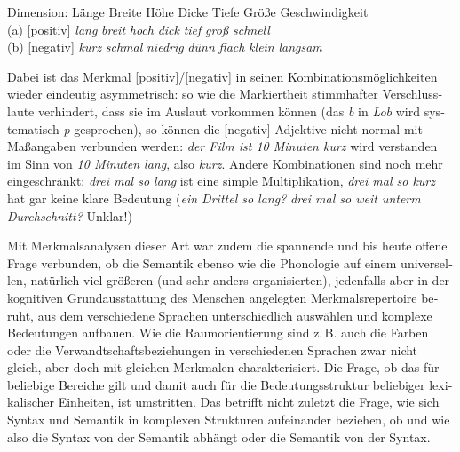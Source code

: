 \documentclass[output=paper,colorlinks,citecolor=brown]{langscibook}
\begin{document}
\begin{otherlanguage}{german}
\ea
\glll Dimension: Länge Breite Höhe Dicke Tiefe Größe Geschwindigkeit \\
{(a) [positiv]} \textit{lang} \textit{breit} \textit{hoch} \textit{dick} \textit{tief} \textit{groß} \textit{schnell} \\
{(b) [negativ]} \textit{kurz} \textit{schmal} \textit{niedrig} \textit{dünn} \textit{flach} \textit{klein} \textit{langsam} \\ 
\label{ex:9}
\z

\noindent Dabei ist das Merkmal [positiv]/[negativ] in seinen Kombinationsmöglichkeiten wieder eindeutig asymmetrisch: so wie die Markiertheit stimmhafter Verschlusslaute verhindert, dass sie im Auslaut vorkommen können (das \textit{b} in \textit{Lob} wird systematisch \textit{p} gesprochen), so können die [negativ]-Adjektive nicht normal mit Maßangaben verbunden werden: \textit{der Film ist 10 Minuten kurz} wird verstanden im Sinn von \textit{10 Minuten lang}, also \textit{kurz}. Andere Kombinationen sind noch mehr eingeschränkt: \textit{drei mal so lang} ist eine simple Multiplikation, \textit{drei mal so kurz} hat gar keine klare Bedeutung (\textit{ein Drittel so lang?} \textit{drei mal so weit unterm Durchschnitt?} Unklar!)

Mit Merkmalsanalysen dieser Art war zudem die spannende und bis heute offene Frage verbunden, ob die Semantik ebenso wie die Phonologie auf einem universellen, natürlich viel größeren (und sehr anders organisierten), jedenfalls aber in der kognitiven Grundausstattung des Menschen angelegten Merkmals\-repertoire beruht, aus dem verschiedene Sprachen unterschiedlich auswählen und komplexe Bedeutungen aufbauen. Wie die Raumorientierung sind z.\,B. auch die Farben oder die Verwandtschaftsbeziehungen in verschiedenen Sprachen zwar nicht gleich, aber doch mit gleichen Merkmalen charakterisiert. Die Frage, ob das für beliebige Bereiche gilt und damit auch für die Bedeutungsstruktur beliebiger lexikalischer Einheiten, ist umstritten. Das betrifft nicht zuletzt die Frage, wie sich Syntax und Semantik in komplexen Strukturen aufeinander beziehen, ob und wie also die Syntax von der Semantik abhängt oder die Semantik von der Syntax.

\section{}\label{sec:3}


\end{otherlanguage}
\end{document}
